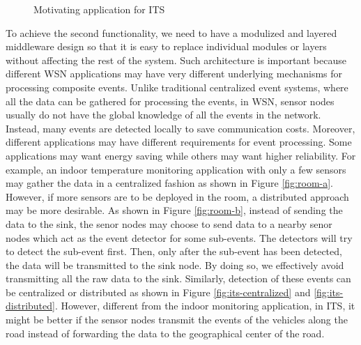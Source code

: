 \begin{figure}
\centering
{}
\caption{Motivating application for ITS}
\label{fig:its}
\end{figure}

To achieve the second functionality, we need to have a modulized and layered middleware design so that it is easy to replace individual modules or layers without affecting the rest of the system. Such architecture is important because different WSN applications may have very different underlying mechanisms for processing composite events. Unlike traditional centralized event systems, where all the data can be gathered for processing the events, in WSN, sensor nodes usually do not have the global knowledge of all the events in the network. Instead, many events are detected locally to save communication costs. Moreover, different applications may have different requirements for event processing. Some applications may want energy saving while others may want higher reliability. For example, an indoor temperature monitoring application with only a few sensors may gather the data in a centralized fashion as shown in Figure \ref{fig:room-a}. However, if more sensors are to be deployed in the room, a distributed approach may be more desirable. As shown in Figure \ref{fig:room-b}, instead of sending the data to the sink, the senor nodes may choose to send data to a nearby senor nodes which act as the event detector for some sub-events. The detectors will try to detect the sub-event first. Then, only after the sub-event has been detected, the data will be transmitted to the sink node. By doing so, we effectively avoid transmitting all the raw data to the sink. Similarly, detection of these events can be centralized or distributed as shown in Figure \ref{fig:its-centralized} and \ref{fig:its-distributed}. However, different from the indoor monitoring application, in ITS, it might be better if the sensor nodes transmit the events of the vehicles along the road instead of forwarding the data to the geographical center of the road. 

